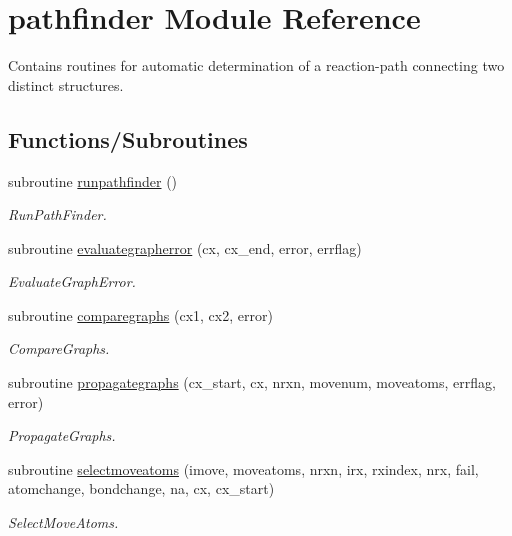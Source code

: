 \hypertarget{namespacepathfinder}{}\section{pathfinder Module Reference}
\label{namespacepathfinder}


Contains routines for automatic determination of a reaction-\/path connecting two distinct structures.  


\subsection*{Functions/\+Subroutines}
\begin{DoxyCompactItemize}
\item 
subroutine \mbox{\hyperlink{namespacepathfinder_a7ce0d0c193755a13466c3a5c273b21d2}{runpathfinder}} ()
\begin{DoxyCompactList}\small\item\em Run\+Path\+Finder. \end{DoxyCompactList}\item 
subroutine \mbox{\hyperlink{namespacepathfinder_ac162e64b047281f6a8040365318bf631}{evaluategrapherror}} (cx, cx\+\_\+end, error, errflag)
\begin{DoxyCompactList}\small\item\em Evaluate\+Graph\+Error. \end{DoxyCompactList}\item 
subroutine \mbox{\hyperlink{namespacepathfinder_a0de07862cb4c5d601bd783c1bb17aace}{comparegraphs}} (cx1, cx2, error)
\begin{DoxyCompactList}\small\item\em Compare\+Graphs. \end{DoxyCompactList}\item 
subroutine \mbox{\hyperlink{namespacepathfinder_aeff32d131039907ab2149ee86575c84b}{propagategraphs}} (cx\+\_\+start, cx, nrxn, movenum, moveatoms, errflag, error)
\begin{DoxyCompactList}\small\item\em Propagate\+Graphs. \end{DoxyCompactList}\item 
subroutine \mbox{\hyperlink{namespacepathfinder_ad3176a0a22cdd34dd1b20fb26be06d66}{selectmoveatoms}} (imove, moveatoms, nrxn, irx, rxindex, nrx, fail, atomchange, bondchange, na, cx, cx\+\_\+start)
\begin{DoxyCompactList}\small\item\em Select\+Move\+Atoms. \end{DoxyCompactList}\item 

\end{DoxyCompactItemize}
